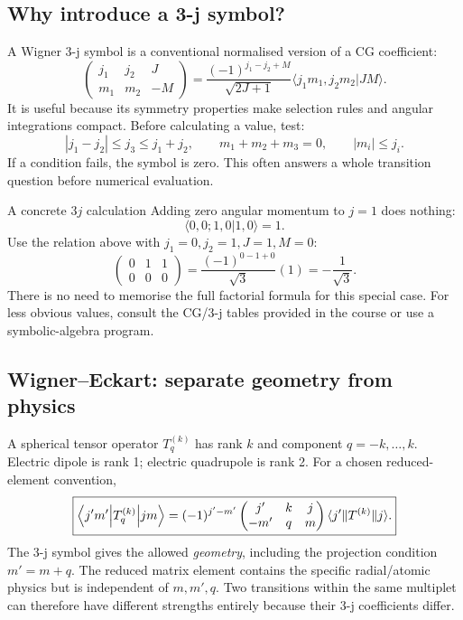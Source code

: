 \subsection{Why introduce a 3-j symbol?}
A Wigner 3-j symbol is a conventional
normalised version of a CG coefficient:
\[
\boxed{
\begin{pmatrix}j_1&j_2&J\\m_1&m_2&-M\end{pmatrix}
=\frac{(-1)^{j_1-j_2+M}}
{\sqrt{2J+1}}
\langle j_1m_1,j_2m_2|JM\rangle.}
\]
It is useful because its symmetry
properties make selection rules and
angular integrations compact.
Before calculating a value, test:
\[
|j_1-j_2|\le j_3\le j_1+j_2,\qquad
m_1+m_2+m_3=0,\qquad |m_i|\le j_i.
\]
If a condition fails, the symbol is zero.
This often answers a whole transition
question before numerical evaluation.

\begin{worked}{A concrete \(3j\) calculation}
Adding zero angular momentum to \(j=1\)
does nothing:
\[
\langle 0,0;1,0|1,0\rangle=1.
\]
Use the relation above with
\(j_1=0,j_2=1,J=1,M=0\):
\[
\begin{pmatrix}0&1&1\\0&0&0\end{pmatrix}
=\frac{(-1)^{0-1+0}}{\sqrt3}(1)
=\boxed{-\frac1{\sqrt3}}.
\]
There is no need to memorise the
full factorial formula for this special case.
For less obvious values, consult the
CG/3-j tables provided in the course
or use a symbolic-algebra program.
\end{worked}

\subsection{Wigner--Eckart: separate geometry from physics}
A spherical tensor operator \(T_q^{(k)}\)
has rank \(k\) and component \(q=-k,\ldots,k\).
Electric dipole is rank 1; electric
quadrupole is rank 2.
For a chosen reduced-element convention,
\[
\boxed{
\left\langle j'm'\middle\vert T_q^{(k)}\middle\vert jm\right\rangle
=(-1)^{j'-m'}
\begin{pmatrix}j'&k&j\\-m'&q&m\end{pmatrix}
\langle j'\Vert T^{(k)}\Vert j\rangle.}
\]
The 3-j symbol gives the allowed
\emph{geometry}, including the projection
condition \(m'=m+q\).
The reduced matrix element contains
the specific radial/atomic physics but
is independent of \(m,m',q\).
Two transitions within the same
multiplet can therefore have
different strengths entirely because
their 3-j coefficients differ.


